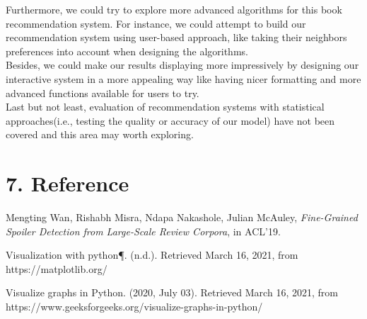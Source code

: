 \documentclass[fontsize=11pt]{article}
\begin{document}
Furthermore, we could try to explore more advanced algorithms for this book recommendation system. For instance, we could attempt to build our recommendation system using user-based approach, like taking their neighbors preferences into account when designing the algorithms.\\

Besides, we could make our results displaying more impressively by designing our interactive system in a more appealing way like having nicer formatting and more advanced functions available for users to try.\\

Last but not least, evaluation of recommendation systems with statistical approaches(i.e., testing the quality or accuracy of our model) have not been covered and this area may worth exploring.\\
 
\section*{7. Reference }

Mengting Wan, Rishabh Misra, Ndapa Nakashole, Julian McAuley, \emph{Fine-Grained Spoiler Detection from Large-Scale Review Corpora}, in ACL'19. \vspace{2mm}\par

Visualization with python¶. (n.d.). Retrieved March 16, 2021, from https://matplotlib.org/\vspace{2mm}\par

Visualize graphs in Python. (2020, July 03). Retrieved March 16, 2021, from https://www.geeksforgeeks.org/visualize-graphs-in-python/\vspace{2mm}\par
\end{document}
